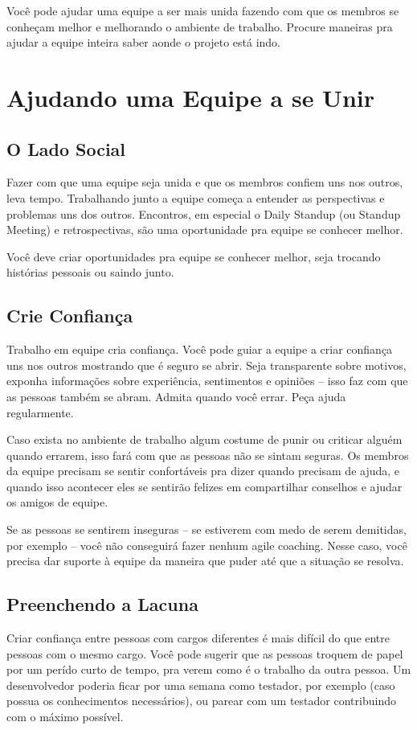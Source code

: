 \documentclass[a4paper, 10pt, font=plain]{abnt}
\begin{document}
Você pode ajudar uma equipe a ser mais unida fazendo com que os membros se conheçam melhor e melhorando o ambiente de trabalho. Procure maneiras pra ajudar a equipe inteira saber aonde o projeto está indo.

\section{Ajudando uma Equipe a se Unir}

\subsection{O Lado Social}
Fazer com que uma equipe seja unida e que os membros confiem uns nos outros, leva tempo. Trabalhando junto a equipe começa a entender as perspectivas e problemas uns dos outros. Encontros, em especial o Daily Standup (ou Standup Meeting) e retrospectivas, são uma oportunidade pra equipe se conhecer melhor.

Você deve criar oportunidades pra equipe se conhecer melhor, seja trocando histórias pessoais ou saindo junto.

\subsection{Crie Confiança}
Trabalho em equipe cria confiança. Você pode guiar a equipe a criar confiança uns nos outros mostrando que é seguro se abrir. Seja transparente sobre motivos, exponha informações sobre experiência, sentimentos e opiniões -- isso faz com que as pessoas também se abram. Admita quando você errar. Peça ajuda regularmente.

Caso exista no ambiente de trabalho algum costume de punir ou criticar alguém quando errarem, isso fará com que as pessoas não se sintam seguras. Os membros da equipe precisam se sentir confortáveis pra dizer quando precisam de ajuda, e quando isso acontecer eles se sentirão felizes em compartilhar conselhos e ajudar os amigos de equipe.

Se as pessoas se sentirem inseguras -- se estiverem com medo de serem demitidas, por exemplo -- você não conseguirá fazer nenhum agile coaching. Nesse caso, você precisa dar suporte à equipe da maneira que puder até que a situação se resolva.


\subsection{Preenchendo a Lacuna}
Criar confiança entre pessoas com cargos diferentes é mais difícil do que entre pessoas com o mesmo cargo. Você pode sugerir que as pessoas troquem de papel por um perído curto de tempo, pra verem como é o trabalho da outra pessoa. Um desenvolvedor poderia ficar por uma semana como testador, por exemplo (caso possua os conhecimentos necessários), ou parear com um testador contribuindo com o máximo possível.
\end{document}
